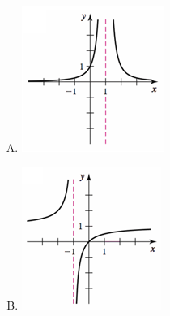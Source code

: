 \documentclass[12pt]{article}
\begin{document}
\begin{enumerate}
\begin{enumerate}[(A)]

	\item \includegraphics[scale=1.3]{exam1bsec2p4C}\hspace{3pc}
	\vspace{3pc}
	
	\item \includegraphics[scale=1.3]{exam1bsec2p4B}\hspace{3pc}
	\vspace{3pc}
	

\end{enumerate}
\end{enumerate}
\end{document}
